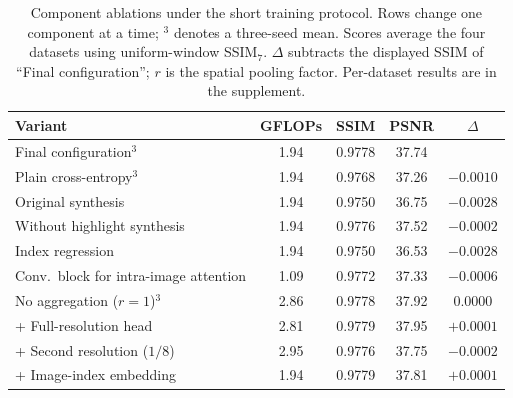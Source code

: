 \begin{table}[htb]
\centering
\small
\setlength{\tabcolsep}{2pt}
\caption{Component ablations under the short training protocol. Rows change one component at a time; $^3$ denotes a three-seed mean. Scores average the four datasets using uniform-window SSIM$_7$. $\Delta$ subtracts the displayed SSIM of ``Final configuration''; $r$ is the spatial pooling factor. Per-dataset results are in the supplement.}
\label{tab:ablation}
\begin{tabular}{lcccc}
\toprule
Variant & GFLOPs & SSIM & PSNR & $\Delta$ \\
\midrule
Final configuration$^{3}$ & 1.94 & 0.9778 & 37.74 &  \\
\midrule
Plain cross-entropy$^{3}$ & 1.94 & 0.9768 & 37.26 & $-0.0010$ \\
Original synthesis & 1.94 & 0.9750 & 36.75 & $-0.0028$ \\
Without highlight synthesis & 1.94 & 0.9776 & 37.52 & $-0.0002$ \\
Index regression & 1.94 & 0.9750 & 36.53 & $-0.0028$ \\
Conv.\ block for intra-image attention & 1.09 & 0.9772 & 37.33 & $-0.0006$ \\
No aggregation ($r=1$)$^{3}$ & 2.86 & 0.9778 & 37.92 & 0.0000 \\
\midrule
+ Full-resolution head & 2.81 & 0.9779 & 37.95 & $+0.0001$ \\
+ Second resolution ($1/8$) & 2.95 & 0.9776 & 37.75 & $-0.0002$ \\
+ Image-index embedding & 1.94 & 0.9779 & 37.81 & $+0.0001$ \\
\bottomrule
\end{tabular}
\end{table}
